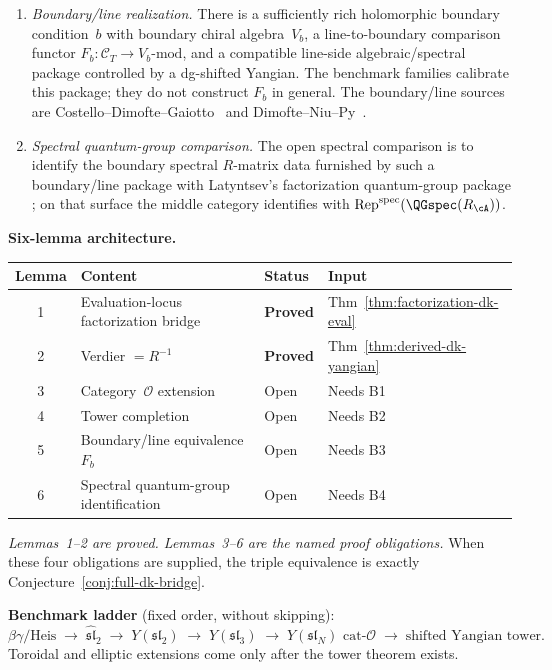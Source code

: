 \begin{remark}
\begin{enumerate}[label=\textup{B\arabic*.}]
\item \label{item:B3}
 \emph{Boundary/line realization.}
 There is a sufficiently rich holomorphic boundary condition~$b$
 with boundary chiral algebra~$V_b$, a line-to-boundary comparison
 functor
 $F_b \colon \mathcal{C}_T \to V_b\text{-mod}$,
 and a compatible line-side algebraic/spectral package controlled by
 a dg-shifted Yangian.
 The benchmark families calibrate this package; they do not construct
 $F_b$ in general. The boundary/line sources are
 Costello--Dimofte--Gaiotto~\cite{CDG2023} and
 Dimofte--Niu--Py~\cite{DNP25}.

\item \label{item:B4}
 \emph{Spectral quantum-group comparison.}
 The open spectral comparison is to identify the boundary spectral
 $R$-matrix data furnished by such a boundary/line package with
 Latyntsev's factorization quantum-group package
 \cite{Latyntsev23}; on that surface the middle category identifies with
 $\operatorname{Rep}^{\mathrm{spec}}(\QGspec(R_{\cA}))$.
\end{enumerate}

\medskip\noindent
\textbf{Six-lemma architecture.}
\begin{center}
\renewcommand{\arraystretch}{1.2}
\begin{tabular}{clll}
\textbf{Lemma} & \textbf{Content} & \textbf{Status} & \textbf{Input} \\
\hline
1 & Evaluation-locus factorization bridge
 & \textbf{Proved} & Thm~\ref{thm:factorization-dk-eval} \\
2 & Verdier $= R^{-1}$
 & \textbf{Proved} & Thm~\ref{thm:derived-dk-yangian} \\
3 & Category~$\mathcal{O}$ extension
 & Open & Needs B1 \\
4 & Tower completion
 & Open & Needs B2 \\
5 & Boundary/line equivalence $F_b$
 & Open & Needs B3 \\
6 & Spectral quantum-group identification
 & Open & Needs B4 \\
\end{tabular}
\end{center}
\emph{Lemmas~1--2 are proved. Lemmas~3--6 are the named proof
obligations.} When these four obligations are supplied, the triple
equivalence is exactly Conjecture~\ref{conj:full-dk-bridge}.

\medskip\noindent
\textbf{Benchmark ladder} (fixed order, without skipping):
\[
\beta\gamma\text{/Heis}
\;\to\; \hat{\mathfrak{sl}}_2
\;\to\; Y(\mathfrak{sl}_2)
\;\to\; Y(\mathfrak{sl}_3)
\;\to\; Y(\mathfrak{sl}_N)\text{ cat-}\mathcal{O}
\;\to\; \text{shifted Yangian tower.}
\]
Toroidal and elliptic extensions come only after the tower theorem
exists.
\end{remark}

